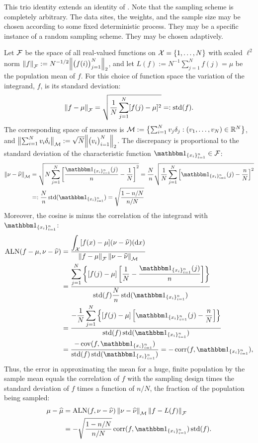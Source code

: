 \documentclass[graybox]{svmult}
\newcommand{\R}{\mathbb{R}} %
\DeclareMathOperator{\std}{std}
\DeclareMathOperator{\cov}{cov}
\DeclareMathOperator{\corr}{corr}
\DeclareMathOperator{\algn}{ALN}
\begin{document}
This trio identity extends an identity of \cite{Meng}.  Note that the sampling scheme is completely arbitrary.  The data sites, the weights, and the sample size may be chosen according to some fixed deterministic process.  They may be a specific instance of a random sampling scheme.   They may be chosen adaptively.

\begin{example}  \label{bigdataB} Let $\mathcal{F}$ be the space of all real-valued functions on $\mathcal{X} = \{1, \ldots, N\}$ with scaled $\ell^2$ norm $\left \lVert f \right \rVert_{\mathcal{F}} := N^{-1/2} \Bigl \lVert \bigl(f(i)\bigr)_{j=1}^N \Bigr \rVert_2$, and let $L(f) := N^{-1}\sum_{j=1}^N f(j) = \mu $ be the population mean of $f$. For this choice of function space the variation of the integrand, $f$, is its standard deviation:
\[
\norm{f - \mu}_{\cf} = \sqrt{\frac 1N \sum_{j=1}^N [f(j) - \mu]^2} =: \std(f).
\]
The corresponding space of measures is $\cm := \bigl \{ \sum_{i=1}^N v_j \delta_{j} : (v_1, \ldots, v_N) \in \R^N \bigr \}$, and $\bigl \lVert \sum_{i=1}^N v_i \delta_{i} \bigr \rVert_{\mathcal{M}} : = \sqrt{N} \Bigl \lVert \bigl(v_i\bigr)_{i=1}^N \Bigr \rVert_2$.   The discrepancy is proportional to the standard deviation of the characteristic function $\bbone_{\{x_i\}_{i=1}^n} \in \cf$:
\begin{align*}
\norm{\nu- \hnu}_{\cm} & = \sqrt{ N \sum_{j=1}^N \left[\frac{\bbone_{\{x_i\}_{i=1}^n}(j)}{n} - \frac 1N\right]^2}  =  \frac {N} {n}\sqrt{\frac{1}{N} \sum_{j=1}^N \left[\bbone_{\{x_i\}_{i=1}^n}(j) - \frac nN\right]^2} \\
& =: \frac {N} {n} \std(\bbone_{\{x_i\}_{i=1}^n}) =  \sqrt{\frac{1 - n/N}{n/N}}
\end{align*}
Moreover, the cosine is minus the correlation of the integrand with  $\bbone_{\{x_i\}_{i=1}^n}$:
\begin{align*}
\algn(f-\mu,\nu - \hnu) & = \frac{\displaystyle \int_{\cx} [f(x) - \mu] (\nu - \hnu)(\D x)}{ \norm{f - \mu}_{\cf} \norm{\nu- \hnu}_{\cm}}  \\
& = \frac{\displaystyle \sum_{j=1}^N \left\{[f(j) - \mu]\left[\frac 1N - \frac{\bbone_{\{x_i\}_{i=1}^n}(j)}{n} \right] \right\} }{ \displaystyle \std(f) \frac {N} {n} \std(\bbone_{\{x_i\}_{i=1}^n}) } \\
& = \frac{\displaystyle - \frac{1}{N}\sum_{j=1}^N \left\{[f(j) - \mu]\left[\bbone_{\{x_i\}_{i=1}^n}(j) - \frac nN \right] \right\}  }{ \std(f)  \std(\bbone_{\{x_i\}_{i=1}^n}) } \\
& = \frac{- \cov(f, \bbone_{\{x_i\}_{i=1}^n})}{ \std(f)  \std(\bbone_{\{x_i\}_{i=1}^n}) } = -  \corr(f, \bbone_{\{x_i\}_{i=1}^n}),
\end{align*}
Thus, the error in approximating the mean for a huge, finite population by the sample mean equals the correlation of $f$ with the sampling design times the standard deviation of $f$ times a function of $n/N$, the fraction of the population being sampled:
\begin{align*}
\mu - \hmu &= \algn(f,\nu - \hnu)  \norm{\nu - \hnu}_{\cm} \norm{f- L(f)}_{\cf}\\
& = -\sqrt{\frac{1 - n/N}{n/N}}  \corr(f, \bbone_{\{x_i\}_{i=1}^n}) \std(f).
\end{align*}


\end{example}
\end{document}
